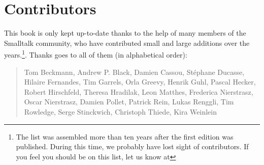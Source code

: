 \chapter*{Contributors}
This book is only kept up-to-date thanks to the help of many members of the Smalltalk community, who have contributed small and large additions over the years.\footnote{The list was assembled more than ten years after the first edition was published. During this time, we probably have lost sight of contributors. If you feel you should be on this list, let us know at \sbeRepoUrl}. Thanks goes to all of them (in alphabetical order):


\begin{quotation}
Tom Beckmann, Andrew P. Black, Damien Cassou, St\'ephane Ducasse, Hilaire Fernandes, Tim Garrels, Orla Greevy, Henrik Guhl, Pascal Hecker, Robert Hirschfeld, Theresa Hradilak, Leon Matthes, Frederica Nierstrasz, Oscar Nierstrasz, Damien Pollet, Patrick Rein, Lukas Renggli, Tim Rowledge, Serge Stinckwich, Christoph Thiede, Kira Weinlein
\end{quotation}

%
%
%
